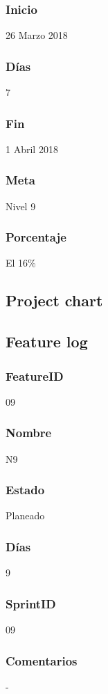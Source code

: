 \subsubsection{Inicio}
26 Marzo 2018
\subsubsection{Días}
7
\subsubsection{Fin}
1 Abril 2018
\subsubsection{Meta}
Nivel 9
\subsubsection{Porcentaje}
El 16\% 


\subsection{Project chart}



\subsection{Feature log}

\subsubsection{FeatureID}
09
\subsubsection{Nombre}
N9
\subsubsection{Estado}
Planeado
\subsubsection{Días}
9
\subsubsection{SprintID}
09
\subsubsection{Comentarios}
-


